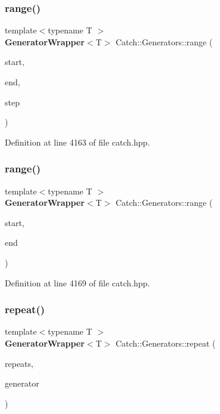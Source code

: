 \subsubsection{range()\hspace{0.1cm}{\footnotesize\ttfamily [1/2]}}
{\footnotesize\ttfamily template$<$typename T $>$ \\
\textbf{ Generator\+Wrapper}$<$T$>$ Catch\+::\+Generators\+::range (\begin{DoxyParamCaption}\item[{T const \&}]{start,  }\item[{T const \&}]{end,  }\item[{T const \&}]{step }\end{DoxyParamCaption})}



Definition at line 4163 of file catch.\+hpp.

\mbox{\label{namespace_catch_1_1_generators_a75b1b4ab3b52a8d99f9d049824500371}} 
\subsubsection{range()\hspace{0.1cm}{\footnotesize\ttfamily [2/2]}}
{\footnotesize\ttfamily template$<$typename T $>$ \\
\textbf{ Generator\+Wrapper}$<$T$>$ Catch\+::\+Generators\+::range (\begin{DoxyParamCaption}\item[{T const \&}]{start,  }\item[{T const \&}]{end }\end{DoxyParamCaption})}



Definition at line 4169 of file catch.\+hpp.

\mbox{\label{namespace_catch_1_1_generators_a3a30dce0fd8e3818baaca086ba5fd35a}} 
\subsubsection{repeat()}
{\footnotesize\ttfamily template$<$typename T $>$ \\
\textbf{ Generator\+Wrapper}$<$T$>$ Catch\+::\+Generators\+::repeat (\begin{DoxyParamCaption}\item[{size\+\_\+t}]{repeats,  }\item[{\textbf{ Generator\+Wrapper}$<$ T $>$ \&\&}]{generator }\end{DoxyParamCaption})}



